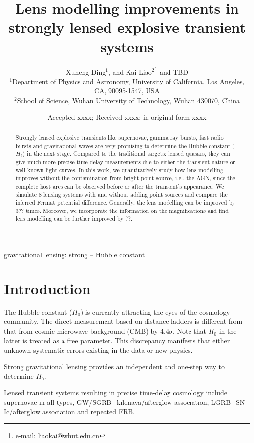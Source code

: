 \documentclass[useAMS,usenatbib,usegraphicx]{mn2e}
\title[Lens modelling improvements in lensed transients]{Lens modelling improvements in strongly lensed explosive transient systems}
\author[Ding et al.]
{Xuheng Ding$^{1}$,
and Kai Liao$^{2}$\thanks{e-mail: liaokai@whut.edu.cn}
and TBD\\
$^{1}$Department of Physics and Astronomy, University of California, Los Angeles, CA, 90095-1547, USA\\
$^{2}$School of Science, Wuhan University of Technology, Wuhan 430070, China}
\begin{document}
\date{Accepted xxxx; Received xxxx; in original form xxxx}

\pagerange{\pageref{firstpage}--\pageref{lastpage}} 

\maketitle

\label{firstpage}

\begin{abstract}
  Strongly lensed explosive transients like supernovae, gamma ray bursts, fast radio bursts and gravitational waves are very promising to determine the Hubble constant ($H_0$) in the next stage. Compared to the traditional targets: lensed quasars, they can give much more precise time delay measurements due to either the transient nature or well-known light curves. In this work, we quantitatively study how lens modelling improves without the contamination from bright point source, i.e., the AGN, since the complete host arcs can be observed before or after the transient's appearance. We simulate 8 lensing systems with and without adding point sources and compare the inferred Fermat potential difference.
  Generally, the lens modelling can be improved by 3?? times. Moreover, we incorporate
  the information on the magnifications and find lens modelling can be further improved by ??.
\end{abstract}

\begin{keywords}
gravitational lensing: strong \--- Hubble constant
\end{keywords}


\section{Introduction}

The Hubble constant ($H_0$) is currently attracting the eyes of the cosmology community. The direct measurement based on distance ladders is different from that from cosmic microwave background (CMB) by $4.4\sigma$. Note that $H_0$ in the latter is treated as a free parameter. This discrepancy manifests that
either unknown systematic errors existing in the data or new physics.

Strong gravitational lensing provides an independent and one-step way to determine $H_0$.

Lensed transient systems resulting in precise time-delay cosmology
include supernovae in all types,
GW/SGRB+kilonava/afterglow association, LGRB+SN Ic/afterglow association and repeated FRB.
\end{document}
